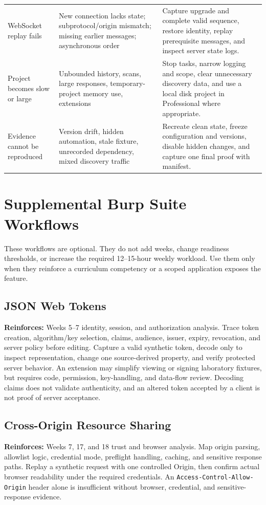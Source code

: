 \documentclass[11pt]{article}
\begin{document}
\begin{longtable}{@{}L{0.23\textwidth}L{0.29\textwidth}L{0.38\textwidth}@{}}
WebSocket replay fails & New connection lacks state; subprotocol/origin mismatch; missing earlier messages; asynchronous order & Capture upgrade and complete valid sequence, restore identity, replay prerequisite messages, and inspect server state logs. \\
Project becomes slow or large & Unbounded history, scans, large responses, temporary-project memory use, extensions & Stop tasks, narrow logging and scope, clear unnecessary discovery data, and use a local disk project in Professional where appropriate. \\
Evidence cannot be reproduced & Version drift, hidden automation, stale fixture, unrecorded dependency, mixed discovery traffic & Recreate clean state, freeze configuration and versions, disable hidden changes, and capture one final proof with manifest. \\
\bottomrule
\end{longtable}
\normalsize

\appendix
\clearpage
\section{Supplemental Burp Suite Workflows}

These workflows are optional. They do not add weeks, change readiness thresholds,
or increase the required 12--15-hour weekly workload. Use them only when they
reinforce a curriculum competency or a scoped application exposes the feature.

\subsection{JSON Web Tokens}
\begin{optionalbox}
\textbf{Reinforces:} Weeks 5--7 identity, session, and authorization analysis.
Trace token creation, algorithm/key selection, claims, audience, issuer, expiry,
revocation, and server policy before editing. Capture a valid synthetic token,
decode only to inspect representation, change one source-derived property, and
verify protected server behavior. An extension may simplify viewing or signing
laboratory fixtures, but requires code, permission, key-handling, and data-flow
review. Decoding claims does not validate authenticity, and an altered token
accepted by a client is not proof of server acceptance.
\end{optionalbox}

\subsection{Cross-Origin Resource Sharing}
\begin{optionalbox}
\textbf{Reinforces:} Weeks 7, 17, and 18 trust and browser analysis. Map origin
parsing, allowlist logic, credential mode, preflight handling, caching, and
sensitive response paths. Replay a synthetic request with one controlled Origin,
then confirm actual browser readability under the required credentials. An
\texttt{Access-Control-Allow-Origin} header alone is insufficient without browser,
credential, and sensitive-response evidence.
\end{optionalbox}
\end{document}
